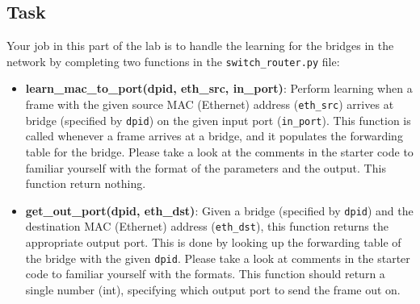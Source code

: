 \documentclass[11pt]{article}
\begin{document}
\subsection{Task}
\label{subsec:logiclearning}
Your job in this part of the lab is to handle the learning for the bridges in the network by completing two functions in the \texttt{switch\_router.py} file:
\begin{itemize}
    \item \textbf{learn\_mac\_to\_port(dpid, eth\_src, in\_port)}: Perform learning when a frame with the given source MAC (Ethernet) address (\texttt{eth\_src}) arrives at bridge (specified by \texttt{dpid}) on the given input port (\texttt{in\_port}). This function is called whenever a frame arrives at a bridge, and it populates the forwarding table for the bridge. Please take a look at the comments in the starter code to familiar yourself with the format of the parameters and the output. This function return nothing.

    \item \textbf{get\_out\_port(dpid, eth\_dst)}: Given a bridge (specified by \texttt{dpid}) and the destination MAC (Ethernet) address (\texttt{eth\_dst}), this function returns the appropriate output port. This is done by looking up the forwarding table of the bridge with the given \texttt{dpid}. Please take a look at comments in the starter code to familiar yourself with the formats. This function should return a single number (int), specifying which output port to send the frame out on.

\end{itemize}



\end{document}
